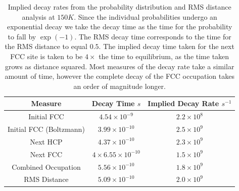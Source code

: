 \begin{table}[htbp]
    \begin{center}
        \begin{tabular}{ *{3}{c} }
            \toprule
            Measure                 & Decay Time \(s\)                   & Implied Decay Rate \(s^{-1}\) \\
            \midrule
            Initial FCC             & \(4.54\times{}10^{-9}\)            & \(2.2\times{}10^{8}\)         \\
            Initial FCC (Boltzmann) & \(3.99\times{}10^{-10}\)           & \(2.5\times{}10^{9}\)         \\
            Next HCP                & \(4.37\times{}10^{-10}\)           & \(2.3\times{}10^{9}\)         \\
            Next FCC                & \(4\times{}6.55 \times{}10^{-10}\) & \(1.5\times{}10^{9}\)         \\
            Combined Occupation     & \(5.56\times{}10^{-10}\)           & \(1.8\times{}10^{9}\)         \\
            RMS Distance            & \(5.09\times{}10^{-10}\)           & \(2.0 \times 10^{9}\)         \\
            \bottomrule
        \end{tabular}
    \end{center}
    \caption{Implied decay rates
        from the probability
        distribution and RMS distance
        analysis at
        \(150K\).
        Since the individual
        probabilities undergo an exponential
        decay we take the decay time as
        the time for the probability to fall
        by \(\exp{(-1)}\).
        The RMS decay time corresponds
        to the time for the RMS distance
        to equal \(0.5\).
        The implied decay time taken for
        the next FCC site is taken to
        be \(4\times \) the time to
        equilibrium, as the time
        taken grows as distance
        squared.
        Most measures
        of the decay rate take a similar
        amount of time, however the
        complete decay of the FCC
        occupation takes an order of
        magnitude longer.
    }\label{tab:implied decay rates}
\end{table}

